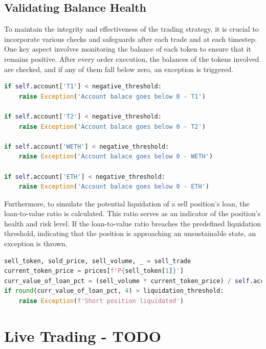 \subsection{Validating Balance Health}
To maintain the integrity and effectiveness of the trading strategy, it is crucial to incorporate various checks and safeguards after each trade and at each timestep. One key aspect involves monitoring the balance of each token to ensure that it remains positive. After every order execution, the balances of the tokens involved are checked, and if any of them fall below zero, an exception is triggered.
\vspace{5mm}
\begin{lstlisting}[language=Python]
if self.account['T1'] < negative_threshold:
    raise Exception('Account balace goes below 0 - T1')

if self.account['T2'] < negative_threshold:
    raise Exception('Account balace goes below 0 - T2')

if self.account['WETH'] < negative_threshold:
    raise Exception('Account balace goes below 0 - WETH')

if self.account['ETH'] < negative_threshold:
    raise Exception('Account balace goes below 0 - ETH')
\end{lstlisting}
\vspace{5mm}    
Furthermore, to simulate the potential liquidation of a sell position's loan, the loan-to-value ratio is calculated. This ratio serves as an indicator of the position's health and risk level. If the loan-to-value ratio breaches the predefined liquidation threshold, indicating that the position is approaching an unsustainable state, an exception is thrown.
\vspace{5mm}
\begin{lstlisting}[language=Python]
sell_token, sold_price, sell_volume, _ = sell_trade
current_token_price = prices[f'P{sell_token[1]}']
curr_value_of_loan_pct = (sell_volume * current_token_price) / self.account['collateral_WETH']
if round(curr_value_of_loan_pct, 4) > liquidation_threshold:
    raise Exception(f'Short position liquidated')
\end{lstlisting}

\section{Live Trading - TODO}
